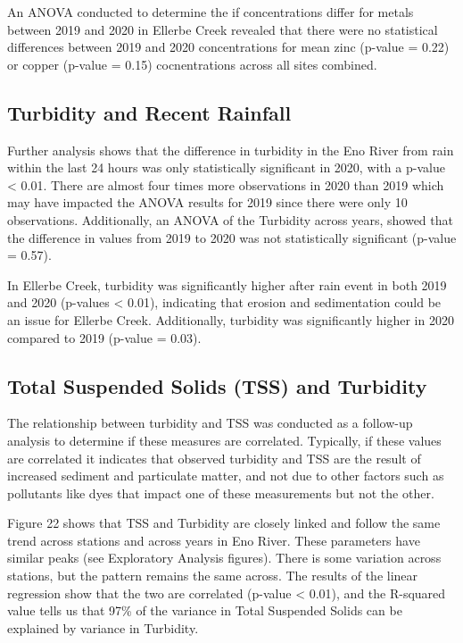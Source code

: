 \documentclass[
  12pt,
]{article}
\begin{document}
An ANOVA conducted to determine the if concentrations differ for metals
between 2019 and 2020 in Ellerbe Creek revealed that there were no
statistical differences between 2019 and 2020 concentrations for mean
zinc (p-value = 0.22) or copper (p-value = 0.15) cocnentrations across
all sites combined.

\hypertarget{turbidity-and-recent-rainfall}{%
\subsection{Turbidity and Recent
Rainfall}\label{turbidity-and-recent-rainfall}}

Further analysis shows that the difference in turbidity in the Eno River
from rain within the last 24 hours was only statistically significant in
2020, with a p-value \textless{} 0.01. There are almost four times more
observations in 2020 than 2019 which may have impacted the ANOVA results
for 2019 since there were only 10 observations. Additionally, an ANOVA
of the Turbidity across years, showed that the difference in values from
2019 to 2020 was not statistically significant (p-value = 0.57).

In Ellerbe Creek, turbidity was significantly higher after rain event in
both 2019 and 2020 (p-values \textless{} 0.01), indicating that erosion
and sedimentation could be an issue for Ellerbe Creek. Additionally,
turbidity was significantly higher in 2020 compared to 2019 (p-value =
0.03).

\hypertarget{total-suspended-solids-tss-and-turbidity}{%
\subsection{Total Suspended Solids (TSS) and
Turbidity}\label{total-suspended-solids-tss-and-turbidity}}

The relationship between turbidity and TSS was conducted as a follow-up
analysis to determine if these measures are correlated. Typically, if
these values are correlated it indicates that observed turbidity and TSS
are the result of increased sediment and particulate matter, and not due
to other factors such as pollutants like dyes that impact one of these
measurements but not the other.

Figure 22 shows that TSS and Turbidity are closely linked and follow the
same trend across stations and across years in Eno River. These
parameters have similar peaks (see Exploratory Analysis figures). There
is some variation across stations, but the pattern remains the same
across. The results of the linear regression show that the two are
correlated (p-value \textless{} 0.01), and the R-squared value tells us
that 97\% of the variance in Total Suspended Solids can be explained by
variance in Turbidity.
\end{document}
